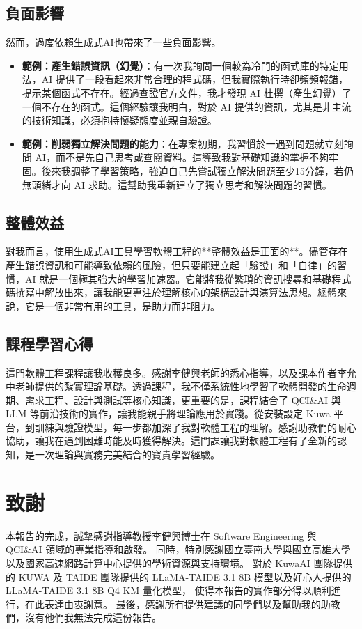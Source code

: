 \documentclass[twocolumn,11pt,a4paper]{article}
\begin{document}
\subsection{負面影響}
然而，過度依賴生成式AI也帶來了一些負面影響。
\begin{itemize}
    \item \textbf{範例：產生錯誤資訊（幻覺）}：有一次我詢問一個較為冷門的函式庫的特定用法，AI 提供了一段看起來非常合理的程式碼，但我實際執行時卻頻頻報錯，提示某個函式不存在。經過查證官方文件，我才發現 AI 杜撰（產生幻覺）了一個不存在的函式。這個經驗讓我明白，對於 AI 提供的資訊，尤其是非主流的技術知識，必須抱持懷疑態度並親自驗證。
    \item \textbf{範例：削弱獨立解決問題的能力}：在專案初期，我習慣於一遇到問題就立刻詢問 AI，而不是先自己思考或查閱資料。這導致我對基礎知識的掌握不夠牢固。後來我調整了學習策略，強迫自己先嘗試獨立解決問題至少15分鐘，若仍無頭緒才向 AI 求助。這幫助我重新建立了獨立思考和解決問題的習慣。
\end{itemize}

\subsection{整體效益}
對我而言，使用生成式AI工具學習軟體工程的**整體效益是正面的**。儘管存在產生錯誤資訊和可能導致依賴的風險，但只要能建立起「驗證」和「自律」的習慣，AI 就是一個極其強大的學習加速器。它能將我從繁瑣的資訊搜尋和基礎程式碼撰寫中解放出來，讓我能更專注於理解核心的架構設計與演算法思想。總體來說，它是一個非常有用的工具，是助力而非阻力。

\subsection{課程學習心得}
這門軟體工程課程讓我收穫良多。感謝李健興老師的悉心指導，以及課本作者李允中老師提供的紮實理論基礎。透過課程，我不僅系統性地學習了軟體開發的生命週期、需求工程、設計與測試等核心知識，更重要的是，課程結合了 QCI\&AI 與 LLM 等前沿技術的實作，讓我能親手將理論應用於實踐。從安裝設定 Kuwa 平台，到訓練與驗證模型，每一步都加深了我對軟體工程的理解。感謝助教們的耐心協助，讓我在遇到困難時能及時獲得解決。這門課讓我對軟體工程有了全新的認知，是一次理論與實務完美結合的寶貴學習經驗。

\section*{致謝}
本報告的完成，誠摯感謝指導教授李健興博士在
Software Engineering 與 QCI\&AI 領域的專業指導和啟發。
同時，特別感謝國立臺南大學與國立高雄大學以及國家高速網路計算中心提供的學術資源與支持環境。
對於 KuwaAI 團隊提供的 KUWA 及 TAIDE 團隊提供的 LLaMA-TAIDE 3.1 8B 模型以及好心人提供的 LLaMA-TAIDE 3.1 8B Q4 KM 量化模型，
使得本報告的實作部分得以順利進行，在此表達由衷謝意。
最後，感謝所有提供建議的同學們以及幫助我的助教們，沒有他們我無法完成這份報告。
\end{document}
